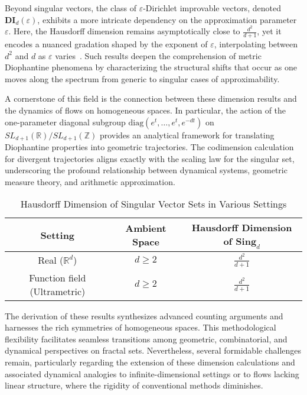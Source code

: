 \documentclass[11pt]{article}
\begin{document}
Beyond singular vectors, the class of $\varepsilon$-Dirichlet improvable vectors, denoted $\mathbf{DI}_d(\varepsilon)$, exhibits a more intricate dependency on the approximation parameter $\varepsilon$. Here, the Hausdorff dimension remains asymptotically close to $\frac{d^2}{d+1}$, yet it encodes a nuanced gradation shaped by the exponent of $\varepsilon$, interpolating between $d^2$ and $d$ as $\varepsilon$ varies~\cite{ref109}. Such results deepen the comprehension of metric Diophantine phenomena by characterizing the structural shifts that occur as one moves along the spectrum from generic to singular cases of approximability.

A cornerstone of this field is the connection between these dimension results and the dynamics of flows on homogeneous spaces. In particular, the action of the one-parameter diagonal subgroup $\mathrm{diag}(e^t, \ldots, e^t, e^{-dt})$ on $SL_{d+1}(\mathbb{R})/SL_{d+1}(\mathbb{Z})$ provides an analytical framework for translating Diophantine properties into geometric trajectories. The codimension calculation for divergent trajectories aligns exactly with the scaling law for the singular set, underscoring the profound relationship between dynamical systems, geometric measure theory, and arithmetic approximation.

\begin{table}[ht]
    \centering
    \caption{Hausdorff Dimension of Singular Vector Sets in Various Settings}
    \label{tab:dimension_comparison}
    \begin{tabular}{|c|c|c|}
        \hline
        \textbf{Setting} & \textbf{Ambient Space} & \textbf{Hausdorff Dimension of $\mathbf{Sing}_d$} \\
        \hline
        Real ($\mathbb{R}^d$) & $d \geq 2$ & $\frac{d^2}{d+1}$ \\
        Function field (Ultrametric) & $d \geq 2$ & $\frac{d^2}{d+1}$ \\
        \hline
    \end{tabular}
\end{table}

The derivation of these results synthesizes advanced counting arguments and harnesses the rich symmetries of homogeneous spaces. This methodological flexibility facilitates seamless transitions among geometric, combinatorial, and dynamical perspectives on fractal sets. Nevertheless, several formidable challenges remain, particularly regarding the extension of these dimension calculations and associated dynamical analogies to infinite-dimensional settings or to flows lacking linear structure, where the rigidity of conventional methods diminishes.
\end{document}
